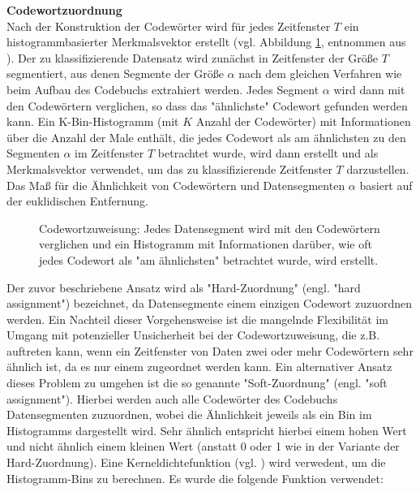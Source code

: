 \textbf{Codewortzuordnung \\}
Nach der Konstruktion der Codewörter wird für jedes Zeitfenster $T$ ein histogrammbasierter Merkmalsvektor erstellt (vgl. Abbildung \ref{fig:ca_assignment}, entnommen aus \cite{kimiaki_codebook_approach_2016}). 
Der zu klassifizierende Datensatz wird zunächst in Zeitfenster der Größe $T$ segmentiert, aus denen Segmente der Größe $\alpha$ nach dem gleichen Verfahren wie beim Aufbau des Codebuchs extrahiert werden. 
Jedes Segment $\alpha$ wird dann mit den Codewörtern verglichen, so dass das "ähnlichste" Codewort gefunden werden kann. 
Ein K-Bin-Histogramm (mit $K$ Anzahl der Codewörter) mit Informationen über die Anzahl der Male enthält, die jedes Codewort als am ähnlichsten zu den Segmenten $\alpha$ im Zeitfenster $T$ betrachtet wurde, wird dann erstellt und als Merkmalsvektor verwendet, um das zu klassifizierende Zeitfenster $T$ darzustellen. 
Das Maß für die Ähnlichkeit von Codewörtern und Datensegmenten $\alpha$ basiert auf der euklidischen Entfernung. \\


\begin{figure}[h]
\caption[Codewortzuweisung]{Codewortzuweisung: Jedes Datensegment wird mit den Codewörtern verglichen und ein Histogramm mit Informationen darüber, wie oft jedes Codewort als "am ähnlichsten" betrachtet wurde, wird erstellt. }
\label{fig:ca_assignment} \end{figure} \vspace{0.5cm}


Der zuvor beschriebene Ansatz wird als "Hard-Zuordnung" (engl. "hard assignment") bezeichnet, da Datensegmente einem einzigen Codewort zuzuordnen werden.
Ein Nachteil dieser Vorgehensweise ist die mangelnde Flexibilität im Umgang mit potenzieller Unsicherheit bei der Codewortzuweisung, die z.B. auftreten kann, wenn ein Zeitfenster von Daten zwei oder mehr Codewörtern sehr ähnlich ist, da es nur einem zugeordnet werden kann. 
Ein alternativer Ansatz dieses Problem zu umgehen ist die so genannte "Soft-Zuordnung" (engl. "soft assignment"). Hierbei werden auch alle Codewörter des Codebuchs Datensegmenten zuzuordnen, wobei die Ähnlichkeit jeweils als ein Bin im Histogramms dargestellt wird. Sehr ähnlich entspricht hierbei einem hohen Wert und nicht ähnlich einem kleinen Wert (anstatt 0 oder 1 wie in der Variante der Hard-Zuordnung). 
Eine Kerneldichtefunktion (vgl. \cite{gemert_ieee_2009}) wird verwedent, um die Histogramm-Bins zu berechnen. Es wurde die folgende Funktion verwendet:


